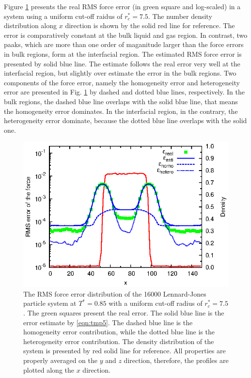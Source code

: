 \documentclass[aps,pre,preprint]{revtex4-1}
\begin{document}
Figure \ref{fig:tmp2} presents the real RMS force error (in green
square and log-scaled) in a system using a uniform cut-off raidus of $r_c^\ast =
7.5$. The number density distribution along $x$ direction is shown by
the solid red line for reference.  The error is comparatively constant
at the bulk liquid and gas region. In contrast, two paaks, which are
more than one order of maganitude larger than the force errors in bulk
regions, form at the interfacial region.  The estimated RMS force
error is presented by solid blue line.  The estimate follows the real
error very well at the interfacial region, but slightly over estimate
the error in the bulk regions.  Two components of the force error,
namely the homogeneity error and heterogeneity error are presented in
Fig. \ref{fig:tmp2} by dashed and dotted blue lines, respectively.  In
the bulk regions, the dashed blue line overlaps with the solid blue
line, that means the homogeneity error dominates.  In the interfacial
region, in the contrary, the heterogeneity error dominate, because the
dotted blue line overlaps with the solid one.

\begin{figure}
  \centering
  \includegraphics[]{fig/t0.85-n16000-rc07.5uni/error.uniform.eps}
  \caption{The RMS force error distribution of the 16000 Lennard-Jones
    particle system at $T^\ast=0.85$ with a uniform cut-off radius of
    $r_c^\ast = 7.5$. The green squares present the real error. The
    solid blue line is the error estimate by \eqref{eqn:tmp5}. The
    dashed blue line is the homogeneity error contribution, while the
    dotted blue line is the heterogeneity error contribution. The
    density distribution of the system is presented by red solid line
    for reference.  All properties are properly averaged on the $y$
    and $z$ direction, therefore, the profiles are plotted along the
    $x$ direction.  }
  \label{fig:tmp2}
\end{figure}
\end{document}
